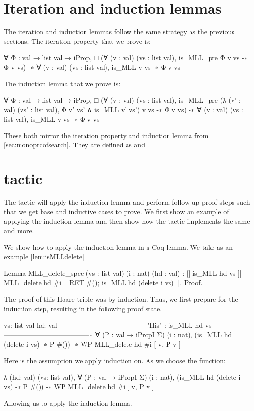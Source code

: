 \documentclass[thesis.tex]{subfiles}
\begin{document}
{\section{Iteration and induction lemmas}\label{sec:constriterind}
The iteration and induction lemmas follow the same strategy as the previous sections. The iteration property that we prove is:
\begin{coqcode}
  ∀ Φ : val → list val → iProp,
       □ (∀ (v : val) (vs : list val), 
            is_MLL_pre Φ v vs -∗ Φ v vs) 
    -∗ ∀ (v : val) (vs : list val), is_MLL v vs -∗ Φ v vs
\end{coqcode}
The induction lemma that we prove is:
\begin{coqcode}
  ∀ Φ : val → list val → iProp,
       □ (∀ (v : val) (vs : list val), 
               is_MLL_pre 
                  (λ (v' : val) (vs' : list val), 
                    Φ v' vs' ∧ is_MLL v' vs') 
                  v vs 
            -∗ Φ v vs) 
    -∗ ∀ (v : val) (vs : list val), is_MLL v vs -∗ Φ v vs
\end{coqcode}
These both mirror the iteration property and induction lemma from \cref{sec:monoproofsearch}. They are defined as  and .

\section{ tactic}\label{sec:inductiontactic}
The  tactic will apply the induction lemma and perform follow-up proof steps such that we get base and inductive cases to prove. We first show an example of applying the induction lemma and then show how the  tactic implements the same and more.

\begin{example}{}{}
    We show how to apply the induction lemma in a Coq lemma.
    We take as an example \cref{lem:isMLLdelete}.
    \begin{coqcode}
    Lemma MLL_delete_spec (vs : list val) 
                          (i : nat) (hd : val) :
      [[{ is_MLL hd vs }]]
        MLL_delete hd #i
      [[{ RET #(); is_MLL hd (delete i vs) }]].
    Proof.
  \end{coqcode}
    The proof of this Hoare triple was by induction. Thus, we first prepare for the induction step, resulting in the following proof state.
    \begin{coqcode}
    vs: list val
    hd: val
    --------------------------------------
    "His" : is_MLL hd vs
    --------------------------------------∗
    ∀ (P : val → iPropI Σ) (i : nat),
      (is_MLL hd (delete i vs) -∗ P #()) -∗ 
      WP MLL_delete hd #i [{ v, P v }]
  \end{coqcode}
    Here  is the assumption we apply induction on. As  we choose the function:
    \begin{coqcode}
    λ (hd: val) (vs: list val), 
      ∀ (P : val → iPropI Σ) (i : nat),
        (is_MLL hd (delete i vs) -∗ P #()) -∗ 
        WP MLL_delete hd #i [{ v, P v }]
  \end{coqcode}
    Allowing us to apply the induction lemma.
\end{example}

}
\end{document}
